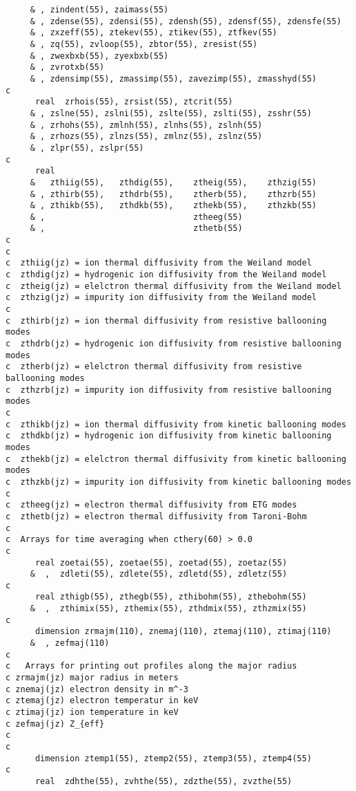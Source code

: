 \begin{verbatim}
     & , zindent(55), zaimass(55)
     & , zdense(55), zdensi(55), zdensh(55), zdensf(55), zdensfe(55)
     & , zxzeff(55), ztekev(55), ztikev(55), ztfkev(55)
     & , zq(55), zvloop(55), zbtor(55), zresist(55)
     & , zwexbxb(55), zyexbxb(55)
     & , zvrotxb(55)
     & , zdensimp(55), zmassimp(55), zavezimp(55), zmasshyd(55)
c
      real  zrhois(55), zrsist(55), ztcrit(55)
     & , zslne(55), zslni(55), zslte(55), zslti(55), zsshr(55)
     & , zrhohs(55), zmlnh(55), zlnhs(55), zslnh(55)
     & , zrhozs(55), zlnzs(55), zmlnz(55), zslnz(55)
     & , zlpr(55), zslpr(55)
c
      real
     &   zthiig(55),   zthdig(55),    ztheig(55),    zthzig(55)
     & , zthirb(55),   zthdrb(55),    ztherb(55),    zthzrb(55)
     & , zthikb(55),   zthdkb(55),    zthekb(55),    zthzkb(55)
     & ,                              ztheeg(55)
     & ,                              zthetb(55)
c
c
c  zthiig(jz) = ion thermal diffusivity from the Weiland model
c  zthdig(jz) = hydrogenic ion diffusivity from the Weiland model
c  ztheig(jz) = elelctron thermal diffusivity from the Weiland model
c  zthzig(jz) = impurity ion diffusivity from the Weiland model
c
c  zthirb(jz) = ion thermal diffusivity from resistive ballooning modes
c  zthdrb(jz) = hydrogenic ion diffusivity from resistive ballooning modes
c  ztherb(jz) = elelctron thermal diffusivity from resistive ballooning modes
c  zthzrb(jz) = impurity ion diffusivity from resistive ballooning modes
c
c  zthikb(jz) = ion thermal diffusivity from kinetic ballooning modes
c  zthdkb(jz) = hydrogenic ion diffusivity from kinetic ballooning modes
c  zthekb(jz) = elelctron thermal diffusivity from kinetic ballooning modes
c  zthzkb(jz) = impurity ion diffusivity from kinetic ballooning modes
c
c  ztheeg(jz) = electron thermal diffusivity from ETG modes
c  zthetb(jz) = electron thermal diffusivity from Taroni-Bohm
c
c  Arrays for time averaging when cthery(60) > 0.0
c
      real zoetai(55), zoetae(55), zoetad(55), zoetaz(55)
     &  ,  zdleti(55), zdlete(55), zdletd(55), zdletz(55)
c
      real zthigb(55), zthegb(55), zthibohm(55), zthebohm(55)
     &  ,  zthimix(55), zthemix(55), zthdmix(55), zthzmix(55)
c
      dimension zrmajm(110), znemaj(110), ztemaj(110), ztimaj(110)
     &  , zefmaj(110)
c
c   Arrays for printing out profiles along the major radius
c zrmajm(jz) major radius in meters
c znemaj(jz) electron density in m^-3
c ztemaj(jz) electron temperatur in keV
c ztimaj(jz) ion temperature in keV
c zefmaj(jz) Z_{eff}
c
c
      dimension ztemp1(55), ztemp2(55), ztemp3(55), ztemp4(55)
c
      real  zdhthe(55), zvhthe(55), zdzthe(55), zvzthe(55)

\end{verbatim}

